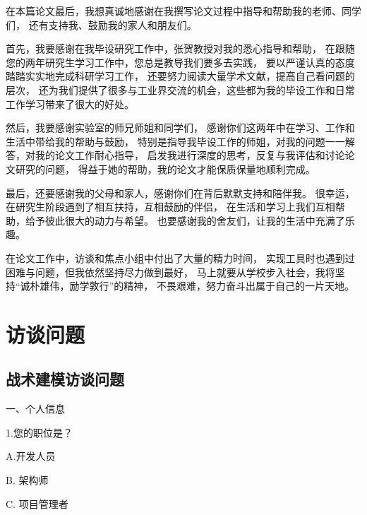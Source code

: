 \documentclass[macfonts,master,oneside]{njuthesis}
\begin{document}
\begin{acknowledgement}
在本篇论文最后，我想真诚地感谢在我撰写论文过程中指导和帮助我的老师、同学们，
还有支持我、鼓励我的家人和朋友们。

首先，我要感谢在我毕设研究工作中，张贺教授对我的悉心指导和帮助，
在跟随您的两年研究生学习工作中，您总是教导我们要多去实践，
要以严谨认真的态度踏踏实实地完成科研学习工作，
还要努力阅读大量学术文献，提高自己看问题的层次，
还为我们提供了很多与工业界交流的机会，这些都为我的毕设工作和日常工作学习带来了很大的好处。

然后，我要感谢实验室的师兄师姐和同学们，
感谢你们这两年中在学习、工作和生活中带给我的帮助与鼓励，
特别是指导我毕设工作的师姐，对我的问题一一解答，对我的论文工作耐心指导，
启发我进行深度的思考，反复与我评估和讨论论文研究的问题，
得益于她的帮助，我的论文才能保质保量地顺利完成。

最后，还要感谢我的父母和家人，感谢你们在背后默默支持和陪伴我。
很幸运，在研究生阶段遇到了相互扶持，互相鼓励的伴侣，
在生活和学习上我们互相帮助，给予彼此很大的动力与希望。
也要感谢我的舍友们，让我的生活中充满了乐趣。

在论文工作中，访谈和焦点小组中付出了大量的精力时间，
实现工具时也遇到过困难与问题，但我依然坚持尽力做到最好，
马上就要从学校步入社会，我将坚持“诚朴雄伟，励学敦行”的精神，
不畏艰难，努力奋斗出属于自己的一片天地。
  
\end{acknowledgement}







\appendix
\chapter{访谈问题}\label{app:1}
\section{战术建模访谈问题}

\noindent 一、个人信息

\noindent 1.您的职位是？

\noindent
A.开发人员

\noindent
B.	架构师

\noindent
C.	项目管理者
\end{document}
